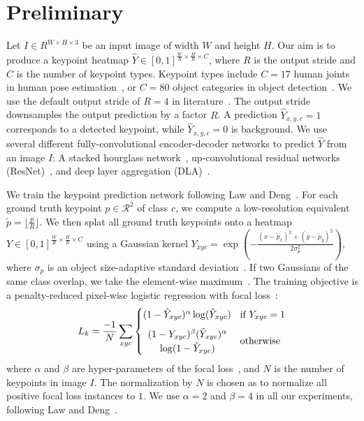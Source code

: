 \documentclass[10pt,twocolumn,letterpaper]{article}
\begin{document}
\section{Preliminary}
\label{sec:prelim}
Let $I \in R^{W \times H \times 3}$ be an input image of width $W$ and height $H$.
Our aim is to produce a keypoint heatmap $\hat Y \in [0,1]^{\frac{W}{R} \times \frac{H}{R} \times C}$, where $R$ is the output stride and $C$ is the number of keypoint types.
Keypoint types include $C=17$ human joints in human pose estimation~\cite{cao2017realtime,xiao2018simple}, or $C=80$ object categories in object detection~\cite{Law_2018_ECCV,zhou2019bottomup}.
We use the default output stride of $R=4$ in literature~\cite{newell2016stacked,cao2017realtime,papandreou2017towards}.
The output stride downsamples the output prediction by a factor $R$.
A prediction $\hat Y_{x,y,c} = 1$ corresponds to a detected keypoint, while $\hat Y_{x,y,c} = 0$ is background.
We use several different fully-convolutional encoder-decoder networks to predict $\hat Y$ from an image $I$: A stacked hourglass network~\cite{newell2016stacked,Law_2018_ECCV}, up-convolutional residual networks (ResNet)~\cite{he2016deep,xiao2018simple}, and deep layer aggregation (DLA)~\cite{yu2018deep}.

We train the keypoint prediction network following Law and Deng~\cite{Law_2018_ECCV}.
For each ground truth keypoint ${p \in \mathcal{R}^2}$ of class $c$, we compute a low-resolution equivalent ${\tilde p = \lfloor \frac{p}{R} \rfloor}$.
We then splat all ground truth keypoints onto a heatmap ${Y \in [0,1]^{\frac{W}{R} \times \frac{H}{R} \times C}}$ using a Gaussian kernel
${Y_{xyc} = \exp\left(-\frac{(x-\tilde p_x)^2+(y-\tilde p_y)^2}{2\sigma_p^2}\right)}$,
where $\sigma_p$ is an object size-adaptive standard deviation~\cite{Law_2018_ECCV}.
If two Gaussians of the same class overlap, we take the element-wise maximum~\cite{cao2017realtime}.
The training objective is a penalty-reduced pixel-wise logistic regression with focal loss~\cite{lin2018focal}:
\begin{equation}
    L_k = \frac{-1}{N} \sum_{xyc}
    \begin{cases}
        (1 - \hat{Y}_{xyc})^{\alpha} 
        \log(\hat{Y}_{xyc}) & \!\text{if}\ Y_{xyc}=1\vspace{2mm}\\
        \begin{array}{c}
        (1-Y_{xyc})^{\beta} 
        (\hat{Y}_{xyc})^{\alpha}\\
        \log(1-\hat{Y}_{xyc})
        \end{array}
        & \!\text{otherwise}
    \end{cases}
\end{equation}
where $\alpha$ and $\beta$ are hyper-parameters of the focal loss~\cite{lin2018focal}, and $N$ is the number of keypoints in image $I$.
The normalization by $N$ is chosen as to normalize all positive focal loss instances to $1$.
We use $\alpha=2$ and $\beta=4$ in all our experiments, following Law and Deng~\cite{Law_2018_ECCV}.
\end{document}
